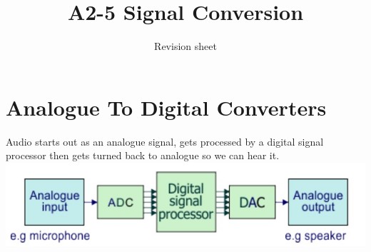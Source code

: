 \documentclass[a4paper,11pt, twocolumn]{article}
\title{A2-5 Signal Conversion}
\author{Revision sheet}
\date{}
\begin{document}
\maketitle
\thispagestyle{fancy}

\section{Analogue To Digital Converters}
Audio starts out as an analogue signal, gets processed by a digital signal processor then gets turned back to analogue so we can hear it. 
\includegraphics[width=\linewidth]{audioSystemBD.jpg}
\end{document}
